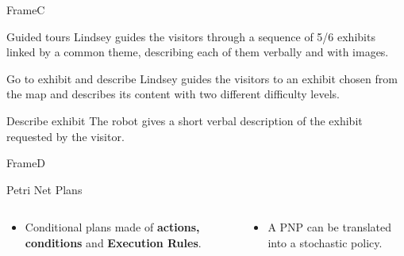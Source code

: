 \documentclass[english,svgnames,notes=hide,aspectratio=169,14pt]{beamer}
\begin{document}
\begin{frame}{FrameC}

   \begin{block}{Guided tours}
      Lindsey guides the visitors through a sequence of 5/6 exhibits
      linked by a common theme, describing each of them verbally and
      with images.
   \end{block}

   \begin{block}{Go to exhibit and describe}
        Lindsey guides the visitors to an exhibit chosen from the map
        and describes its content with two different difficulty levels.
   \end{block}

   \begin{block}{Describe exhibit}
        The robot gives a short verbal description of the exhibit
        requested by the visitor.
   \end{block}

\end{frame}


\begin{frame}{FrameD}

   \begin{block}{Petri Net Plans}

      \begin{columns}

         \begin{column}{6cm}
            \begin{itemize}
               \item Conditional plans made of \textbf{actions, conditions}
                     and \textbf{Execution Rules}.
            \end{itemize}
         \end{column}

         \begin{column}{6cm}
            \begin{itemize}
               \item A PNP can be translated into a stochastic policy.
            \end{itemize}
         \end{column}

      \end{columns}

      \vspace{5mm}

   \end{block}

\end{frame}
\end{document}
